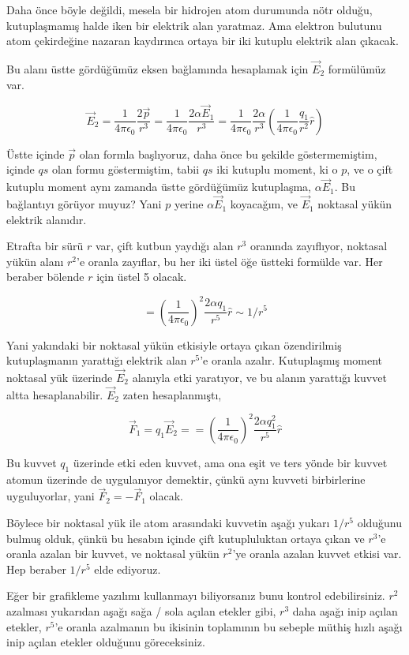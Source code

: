 \documentclass[12pt,fleqn]{article}\usepackage{../../common}
\begin{document}
Daha önce böyle değildi, mesela bir hidrojen atom durumunda nötr olduğu,
kutuplaşmamış halde iken bir elektrik alan yaratmaz. Ama elektron bulutunu atom
çekirdeğine nazaran kaydırınca ortaya bir iki kutuplu elektrik alan çıkacak.

Bu alanı üstte gördüğümüz eksen bağlamında hesaplamak için $\vec{E}_2$
formülümüz var.

$$
\vec{E}_2 = \frac{1}{4\pi\epsilon_0} \frac{2\vec{p}}{r^3} =
 \frac{1}{4\pi\epsilon_0} \frac{2\alpha \vec{E}_1}{r^3} =
 \frac{1}{4\pi\epsilon_0} \frac{2\alpha}{r^3}
 \left(  \frac{1}{4\pi\epsilon_0}  \frac{q_1}{r^2} \hat{r} \right)
$$

Üstte içinde $\vec{p}$ olan formla başlıyoruz, daha önce bu şekilde
göstermemiştim, içinde $qs$ olan formu göstermiştim, tabii $qs$ iki kutuplu
moment, ki o $p$, ve o çift kutuplu moment aynı zamanda üstte gördüğümüz
kutuplaşma, $\alpha \vec{E}_1$. Bu bağlantıyı görüyor muyuz? Yani $p$ yerine
$\alpha \vec{E}_1$ koyacağım, ve $\vec{E}_1$ noktasal yükün elektrik alanıdır.

Etrafta bir sürü $r$ var, çift kutbun yaydığı alan $r^3$ oranında
zayıflıyor, noktasal yükün alanı $r^2$'e oranla zayıflar, bu her iki üstel öğe
üstteki formülde var. Her beraber bölende $r$ için üstel 5 olacak. 
 
$$
= \left( \frac{1}{4\pi\epsilon_0} \right)^2 \frac{2\alpha q_1}{r^5} \hat{r}
\sim 1/r^5
$$

Yani yakındaki bir noktasal yükün etkisiyle ortaya çıkan özendirilmiş
kutuplaşmanın yarattığı elektrik alan $r^5$'e oranla azalır. Kutuplaşmış moment
noktasal yük üzerinde $\vec{E}_2$ alanıyla etki yaratıyor, ve bu alanın
yarattığı kuvvet altta hesaplanabilir. $\vec{E}_2$ zaten hesaplanmıştı,

$$
\vec{F}_1 = q_1 \vec{E}_2 =
= \left( \frac{1}{4\pi\epsilon_0} \right)^2
\frac{2\alpha q_1^2}{r^5} \hat{r}
$$

Bu kuvvet $q_1$ üzerinde etki eden kuvvet, ama ona eşit ve ters yönde bir kuvvet
atomun üzerinde de uygulanıyor demektir, çünkü aynı kuvveti birbirlerine
uyguluyorlar, yani $\vec{F}_2 = -\vec{F}_1$ olacak. 

Böylece bir noktasal yük ile atom arasındaki kuvvetin aşağı yukarı $1/r^5$
olduğunu bulmuş olduk, çünkü bu hesabın içinde çift kutupluluktan ortaya çıkan
ve $r^3$'e oranla azalan bir kuvvet, ve noktasal yükün $r^2$'ye oranla azalan
kuvvet etkisi var. Hep beraber $1/r^5$ elde ediyoruz. 

Eğer bir grafikleme yazılımı kullanmayı biliyorsanız bunu kontrol
edebilirsiniz. $r^2$ azalması yukarıdan aşağı sağa / sola açılan etekler gibi,
$r^3$ daha aşağı inip açılan etekler, $r^5$'e oranla azalmanın bu ikisinin
toplamının bu sebeple müthiş hızlı aşağı inip açılan etekler olduğunu
göreceksiniz.
\end{document}
